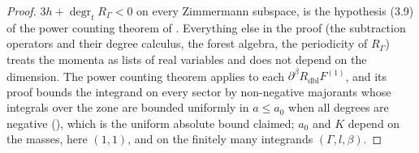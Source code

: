 \begin{proof}
$3h+\operatorname{degr}_tR_\Gamma<0$ on every Zimmermann subspace, is the hypothesis (3.9) of the power counting theorem of \cite{Rei88}. Everything else in the proof (the subtraction operators and their degree calculus, the forest algebra, the periodicity of $R_\Gamma$) treats the momenta as lists of real variables and does not depend on the dimension. The power counting theorem \cite[Thm.~1]{Rei88} applies to each $\partial^\beta R_{\mathrm{dbl}}F^{(1)}$, and its proof bounds the integrand on every sector by non-negative majorants whose integrals over the zone are bounded uniformly in $a\le a_0$ when all degrees are negative (\cite[Sect.~4 and Thm.~2]{Rei88}), which is the uniform absolute bound claimed; $a_0$ and $K$ depend on the masses, here $(1,1)$, and on the finitely many integrands $(\Gamma,l,\beta)$.
\end{proof}

